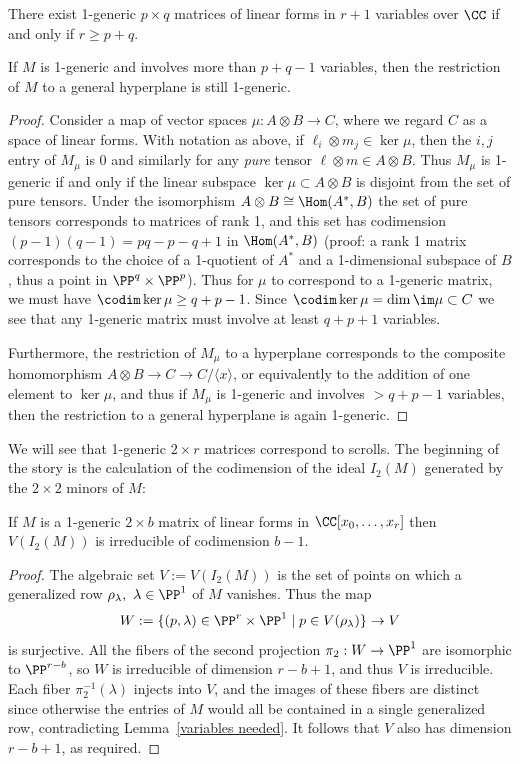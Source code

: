\begin{lemma}\label{existence of 1-generic}\label{variables needed}
  \label{size of 1-generic} There exist 1-generic $p\times q$ matrices of linear forms in $r+1$ variables over $\CC$ if and only if $r\geq p+q$.
  
If $M$ is 1-generic and involves more than $p+q-1$ variables, then the restriction of $M$ to a general hyperplane is still 1-generic.
\end{lemma}
\begin{proof} Consider a map of vector spaces $\mu : A\otimes B \to C$, where we regard $C$ as a 
space of linear forms.
With notation as above, if $\ell_i\otimes m_j\in \ker \mu$, then the $i,j$ entry of $M_\mu$ is 0 and similarly for
any \emph{pure} tensor $\ell\otimes m\in A\otimes B$. Thus $M_\mu$ is 1-generic if and only if the linear subspace
$\ker \mu \subset  A\otimes B$
is disjoint from the set of pure tensors. Under the isomorphism $A\otimes B \cong \Hom (A^*, B)$
the set of pure tensors corresponds to matrices of rank 1, and this set has codimension $(p-1)(q-1) = pq-p-q+1$
in $\Hom(A^*, B)$ (proof: a rank 1 matrix corresponds to the choice of a 1-quotient of $A^*$ and a 1-dimensional subspace
of $B$, thus a point in $\PP^q \times \PP^p$).
Thus
for $\mu$ to correspond to a  1-generic matrix,  we must have $\codim \ker \mu \geq q+p-1$. Since $\codim \ker \mu = \dim \im \mu\subset C$ we see that any 1-generic matrix must involve at least $q+p+1$ variables. 

Furthermore, the restriction of $M_\mu$ to a hyperplane corresponds to the composite homomorphism
$A\otimes B \to C \to C/\langle x \rangle$, or equivalently to the addition of one element to $\ker \mu$, and thus
if $M_\mu$ is 1-generic and involves $>q+p-1$ variables, then the restriction to a general hyperplane
is again 1-generic.
\end{proof}

 
We will see that 1-generic $2\times r$ matrices correspond to scrolls. The beginning of the story is the
 calculation of the codimension of the ideal $I_2(M)$ generated by the $2\times 2$ minors of $M$:

\begin{lemma}\label{codim of 2,n 1-generic}
If $M$ is a 1-generic $2\times b$ matrix of linear forms in $\CC[x_0,\dots, x_r]$ then 
  $V(I_2(M))$ is irreducible of codimension $b-1$.
\end{lemma}

\begin{proof}
The algebraic set $V :=  V(I_2(M))$ is the set of points on which a generalized row $\rho_\lambda, \ \lambda\in \PP^1$ of $M$ vanishes. Thus the map
$$
W := \{(p, \lambda) \in \PP^{r}\times \PP^{1}\mid p\in V(\rho_{\lambda})\} \to V
$$
is surjective. All the fibers of the second projection $\pi_{2}: W\to \PP^{1}$ are isomorphic to $\PP^{r-b}$, so $W$ is
irreducible of dimension $r-b+1$, and thus $V$ is irreducible. Each fiber $\pi_{2}^{-1}(\lambda)$
injects into $V$, and the images of these fibers are distinct since otherwise the entries of $M$ would all
be contained in a single generalized row, contradicting Lemma~\ref{variables needed}. It follows
that $V$ also has dimension $r-b+1$, as required.
\end{proof}


